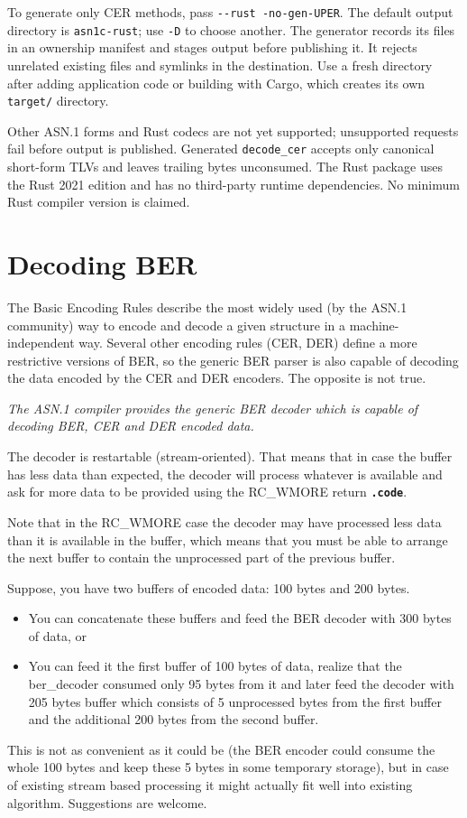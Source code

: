 \documentclass[english,oneside,12pt]{book}
\newcommand{\code}[1]{\texttt{\textbf{\lstinline{#1}}}}
\begin{document}
To generate only CER methods, pass \texttt{-{}-rust -no-gen-UPER}. The default
output directory is \texttt{asn1c-rust}; use \texttt{-D} to choose another.
The generator records its files in an ownership manifest and stages output
before publishing it. It rejects unrelated existing files and symlinks in the
destination. Use a fresh directory after adding application code or building
with Cargo, which creates its own \texttt{target/} directory.

Other ASN.1 forms and Rust codecs are not yet supported; unsupported requests
fail before output is published. Generated \texttt{decode\_cer} accepts only
canonical short-form TLVs and leaves trailing bytes unconsumed. The Rust
package uses the Rust 2021 edition and has no third-party runtime dependencies.
No minimum Rust compiler version is claimed.

\section{\label{sec:Decoding-BER}Decoding BER}

The Basic Encoding Rules describe the most widely used (by the ASN.1
community) way to encode and decode a given structure in a machine-independent
way. Several other encoding rules (CER, DER) define a more restrictive
versions of BER, so the generic BER parser is also capable of decoding
the data encoded by the CER and DER encoders. The opposite is not true.

\emph{The ASN.1 compiler provides the generic BER decoder which is
capable of decoding BER, CER and DER encoded data.}

The decoder is restartable (stream-oriented).
That means that in case the buffer has less data than expected,
the decoder will process whatever is available and ask for more data
to be provided using the RC\_WMORE return \code{.code}.

Note that in the RC\_WMORE case the decoder may have processed less data than
it is available in the buffer, which means that you must be able to arrange
the next buffer to contain the unprocessed part of the previous buffer.

Suppose, you have two buffers of encoded data: 100 bytes and 200 bytes.
\begin{itemize}
\item You can concatenate these buffers and feed the BER decoder with 300
bytes of data, or
\item You can feed it the first buffer of 100 bytes of data, realize that
the ber\_decoder consumed only 95 bytes from it and later feed the
decoder with 205 bytes buffer which consists of 5 unprocessed bytes
from the first buffer and the additional 200 bytes from the second
buffer.
\end{itemize}
This is not as convenient as it could be (the BER encoder could
consume the whole 100 bytes and keep these 5 bytes in some temporary
storage), but in case of existing stream based processing it might
actually fit well into existing algorithm. Suggestions are welcome.
\end{document}
